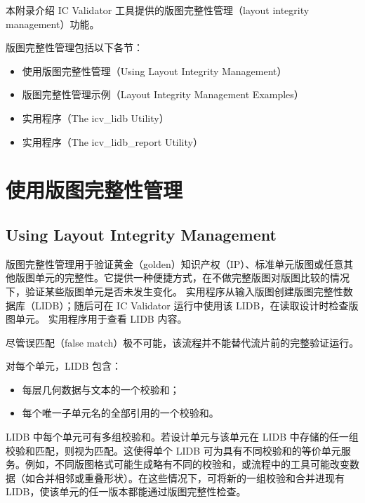 \label{app:c}

本附录介绍 IC Validator 工具提供的版图完整性管理（layout integrity management）功能。

版图完整性管理包括以下各节：
\begin{itemize}
  \item 使用版图完整性管理（Using Layout Integrity Management）
  \item 版图完整性管理示例（Layout Integrity Management Examples）
  \item {} 实用程序（The icv\_lidb Utility）
  \item {} 实用程序（The icv\_lidb\_report Utility）
\end{itemize}

\section{使用版图完整性管理}
\subsection*{Using Layout Integrity Management}

版图完整性管理用于验证黄金（golden）知识产权（IP）、标准单元版图或任意其他版图单元的完整性。它提供一种便捷方式，在不做完整版图对版图比较的情况下，验证某些版图单元是否未发生变化。 实用程序从输入版图创建版图完整性数据库（LIDB）；随后可在 IC Validator 运行中使用该 LIDB，在读取设计时检查版图单元。 实用程序用于查看 LIDB 内容。

\begin{noteBox}
尽管误匹配（false match）极不可能，该流程并不能替代流片前的完整验证运行。
\end{noteBox}

对每个单元，LIDB 包含：
\begin{itemize}
  \item 每层几何数据与文本的一个校验和；
  \item 每个唯一子单元名的全部引用的一个校验和。
\end{itemize}

LIDB 中每个单元可有多组校验和。若设计单元与该单元在 LIDB 中存储的任一组校验和匹配，则视为匹配。这使得单个 LIDB 可为具有不同校验和的等价单元服务。例如，不同版图格式可能生成略有不同的校验和，或流程中的工具可能改变数据（如合并相邻或重叠形状）。在这些情况下，可将新的一组校验和合并进现有 LIDB，使该单元的任一版本都能通过版图完整性检查。

